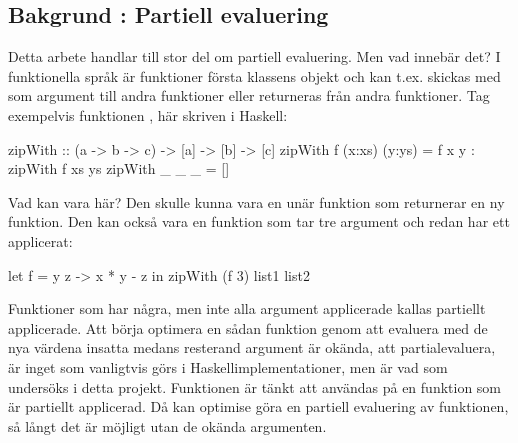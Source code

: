 \documentclass[Rapport]{subfiles}
\begin{document}
\overviewIntro
{}
\subsection{Bakgrund : Partiell evaluering}
Detta arbete handlar till stor del om partiell evaluering. Men vad innebär det?
I funktionella språk är funktioner första klassens objekt och kan t.ex.
skickas med som argument till andra funktioner eller returneras från
andra funktioner. Tag exempelvis funktionen , här skriven i Haskell:

\begin{codeEx}
zipWith :: (a -> b -> c) -> [a] -> [b] -> [c]
zipWith f (x:xs) (y:ys) = f x y : zipWith f xs ys
zipWith _ _      _      = []
\end{codeEx}

Vad kan  vara här? Den skulle kunna vara en unär funktion som returnerar en ny
funktion. Den kan också vara en funktion som tar tre argument och redan har ett
applicerat:

\begin{codeEx}
let f = \x y z -> x * y - z
in  zipWith (f 3) list1 list2
\end{codeEx}


Funktioner som har några, men inte alla argument applicerade kallas 
partiellt applicerade. Att börja optimera en sådan funktion genom att evaluera med de nya värdena
insatta medans resterand argument är okända, att partialevaluera,
är inget som vanligtvis görs i Haskellimplementationer, 
men är vad som undersöks i detta projekt. Funktionen  är
tänkt att användas på en funktion som är partiellt applicerad. Då kan optimise göra en
partiell evaluering av funktionen, så långt det är möjligt utan de okända argumenten.

%
%
\end{document}

